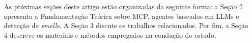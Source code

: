 As próximas seções deste artigo estão organizadas da seguinte forma: a Seção 2 apresenta a Fundamentação Teórica sobre MCP, agentes baseados em LLMs e detecção de \textit{smells}. A Seção 3 discute os trabalhos relacionados. Por fim, a Seção 4 descreve os materiais e métodos empregados na condução do estudo.
